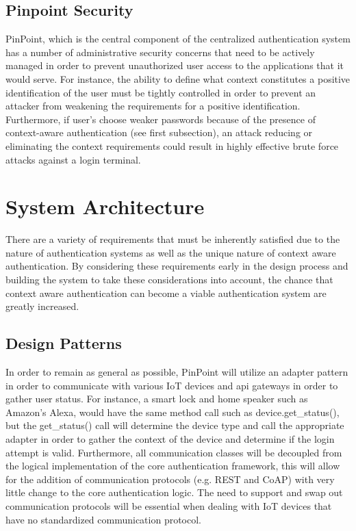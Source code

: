 \documentclass[11pt,journal]{IEEEtran}
\begin{document}
\subsection{Pinpoint Security}
PinPoint, which is the central component of the centralized authentication system has a number of administrative security concerns that need to be actively managed in order to prevent unauthorized user access to the applications that it would serve.  For instance, the ability to define what context constitutes a positive identification of the user must be tightly controlled in order to prevent an attacker from weakening the requirements for a positive identification.  Furthermore, if user's choose weaker passwords because of the presence of context-aware authentication (see first subsection), an attack reducing or eliminating the context requirements could result in highly effective brute force attacks against a login terminal. 

\section{System Architecture}
There are a variety of requirements that must be inherently satisfied due to the nature of authentication systems as well as the unique nature of context aware authentication.  By considering these requirements early in the design process and building the system to take these considerations into account, the chance that context aware authentication can become a viable authentication system are greatly increased.

\subsection{Design Patterns}
In order to remain as general as possible, PinPoint will utilize an adapter pattern in order to communicate with various IoT devices and api gateways in order to gather user status.  For instance, a smart lock and home speaker such as Amazon’s Alexa, would have the same method call such as device.get\_status(), but the get\_status() call will determine the device type and call the appropriate adapter in order to gather the context of the device and determine if the login attempt is valid.  Furthermore, all communication classes will be decoupled from the logical implementation of the core authentication framework, this will allow for the addition of communication protocols (e.g. REST and CoAP) with very little change to the core authentication logic.  The need to support and swap out communication protocols will be essential when dealing with IoT devices that have no standardized communication protocol.
\end{document}
